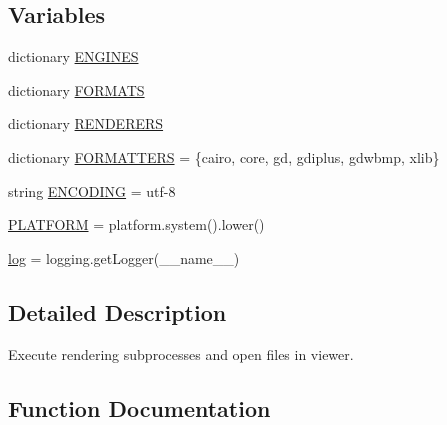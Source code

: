 \subsection*{Variables}
\begin{DoxyCompactItemize}
\item 
dictionary \hyperlink{namespacegraphviz_1_1backend_a84a2f16c27cdea0584e49dff5c211c71}{E\+N\+G\+I\+N\+ES}
\item 
dictionary \hyperlink{namespacegraphviz_1_1backend_aeb48a9f6c54ada7a24d4e3e072fcf124}{F\+O\+R\+M\+A\+TS}
\item 
dictionary \hyperlink{namespacegraphviz_1_1backend_a64f08e302b7e178aa4f30500d7759f8b}{R\+E\+N\+D\+E\+R\+E\+RS}
\item 
dictionary \hyperlink{namespacegraphviz_1_1backend_a6f09436e6e2f80c0f273a34f90058d25}{F\+O\+R\+M\+A\+T\+T\+E\+RS} = \{\textquotesingle{}cairo\textquotesingle{}, \textquotesingle{}core\textquotesingle{}, \textquotesingle{}gd\textquotesingle{}, \textquotesingle{}gdiplus\textquotesingle{}, \textquotesingle{}gdwbmp\textquotesingle{}, \textquotesingle{}xlib\textquotesingle{}\}
\item 
string \hyperlink{namespacegraphviz_1_1backend_aaa5c3555a484c96a0b0e5356ce3a577d}{E\+N\+C\+O\+D\+I\+NG} = \textquotesingle{}utf-\/8\textquotesingle{}
\item 
\hyperlink{namespacegraphviz_1_1backend_abda60bab76c42637d4633cd3c7304120}{P\+L\+A\+T\+F\+O\+RM} = platform.\+system().lower()
\item 
\hyperlink{namespacegraphviz_1_1backend_a91f9698a7f0533d6513e76131e97ec94}{log} = logging.\+get\+Logger(\+\_\+\+\_\+name\+\_\+\+\_\+)
\end{DoxyCompactItemize}


\subsection{Detailed Description}
\begin{DoxyVerb}Execute rendering subprocesses and open files in viewer.\end{DoxyVerb}
 

\subsection{Function Documentation}
\mbox{\label{namespacegraphviz_1_1backend_a86178c80a9e749c977ab49783cc391d8}} 
